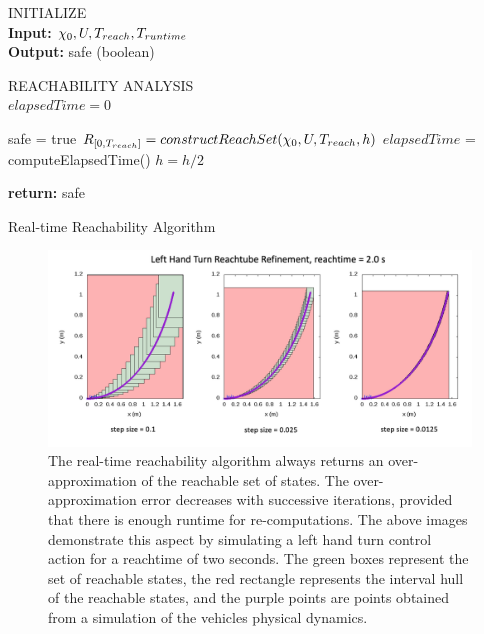 \documentclass[manuscript,screen,review]{acmart}
\begin{document}
\begin{algorithm}[]%
\DontPrintSemicolon 
INITIALIZE{
\\
\textbf{Input:} $\chi_0,\mathnormal{U},T_{reach}, T_{runtime}$ \\
\textbf{Output:} safe (boolean)
}

\vspace{2mm}

REACHABILITY ANALYSIS\\
$elapsedTime = 0$\;
 {
    safe = true\;
    $\mathnormal{R}_{[0,T_{reach}]}= constructReachSet(\chi_0,\mathnormal{U},T_{reach},h)$\;
    $elapsedTime$ = computeElapsedTime()\;
    $h = h /2$\;
    
    
    
}
\textbf{return:} safe
\caption{Real-time Reachability Algorithm}
\label{alg:algo_rtreach}
\end{algorithm}%



\begin{figure}[htbp]%
  \centering
  \includegraphics[width=0.9\linewidth]{figures/refinement_reachset.png}
  \caption{The real-time reachability algorithm always returns an over-approximation of the reachable set of states. The over-approximation error decreases with successive iterations, provided that there is enough runtime for re-computations. The above images demonstrate this aspect by simulating a left hand turn control action for a reachtime of two seconds. The green boxes represent the set of reachable states, the red rectangle represents the interval hull of the reachable states, and the purple points are points obtained from a simulation of the vehicles physical dynamics.}
  \label{fig:reach_refine}
\end{figure}%
\end{document}
